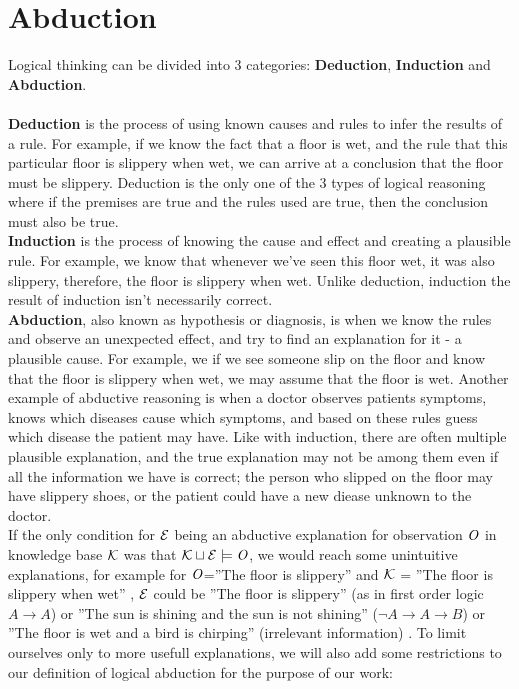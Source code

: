 \chapter{Abduction}\label{chap:Abduction}

Logical thinking can be divided into 3 categories: \textbf{Deduction}, \textbf{Induction} and \textbf{Abduction}. \\ \\
\textbf{Deduction} is the process of using known causes and rules to infer the results of a rule. For example, if we know the fact that a floor is wet, and the rule that this particular floor is slippery when wet, we can arrive at a conclusion that the floor must be slippery. Deduction is the only one of the 3 types of logical reasoning where if the premises are true and the rules used are true, then the conclusion must also be true. \\ 
\textbf{Induction} is the process of knowing the cause and effect and creating a plausible rule. For example, we know that whenever we've seen this floor wet, it was also slippery, therefore, the floor is slippery when wet. Unlike deduction, induction the result of induction isn't necessarily correct. \\
\textbf{Abduction}, also known as hypothesis or diagnosis, is when we know the rules and observe an unexpected effect, and try to find an explanation for it - a plausible cause. For example, we if we see someone slip on the floor and know that the floor is slippery when wet, we may assume that the floor is wet. Another example of abductive reasoning is when a doctor observes patients symptoms, knows which diseases cause which symptoms, and based on these rules guess which disease the patient may have. Like with induction, there are often multiple plausible explanation, and the true explanation may not be among them even if all the information we have is correct; the person who slipped on the floor may have slippery shoes, or the patient could have a new diease unknown to the doctor.\\ 
If the only condition for $\mathcal{E}$ being an abductive explanation for observation $\mathit{O}$ in knowledge base $\mathcal{K}$ was that $\mathcal{K} \sqcup \mathcal{E} \models \mathit{O}$, we would reach some unintuitive explanations, for example for $\mathit{O}$=''The floor is slippery'' and $\mathcal{K}$ = ''The floor is slippery when wet'' , $\mathcal{E}$ could be ''The floor is slippery'' (as in first order logic $A \to A$) or  ''The sun is shining and the sun is not shining'' ($\neg A \to A \to B$) or ''The floor is wet and a bird is chirping'' (irrelevant information) . To limit ourselves only to more usefull explanations, we will also add some restrictions to our definition of logical abduction for the purpose of our work:

